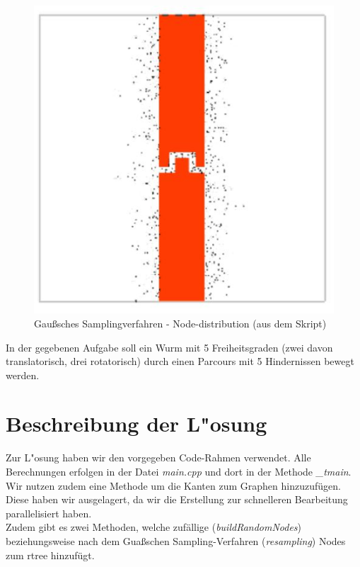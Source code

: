 \documentclass[a4paper]{scrartcl}
\begin{document}
\begin{figure}
\includegraphics[width=\textwidth]{GaussianSamplingNodeDistribution.JPG}
\caption{Gaußsches Samplingverfahren - Node-distribution (aus dem Skript)}
\label{img:GausSample}
\end{figure}

In der gegebenen Aufgabe soll ein Wurm mit 5 Freiheitsgraden (zwei davon translatorisch, drei rotatorisch) durch einen Parcours mit 5 Hindernissen bewegt werden.

\section*{Beschreibung der L"osung}

Zur L"osung haben wir den vorgegeben Code-Rahmen verwendet. Alle Berechnungen erfolgen in der Datei \textit{main.cpp} und dort in der Methode \textit{\_tmain}. Wir nutzen zudem eine Methode um die Kanten zum Graphen hinzuzufügen. Diese haben wir ausgelagert, da wir die Erstellung zur schnelleren Bearbeitung parallelisiert haben.\\

Zudem gibt es zwei Methoden, welche zufällige (\textit{buildRandomNodes}) beziehungsweise nach dem Guaßschen Sampling-Verfahren (\textit{resampling}) Nodes zum rtree hinzufügt.\\
\end{document}

